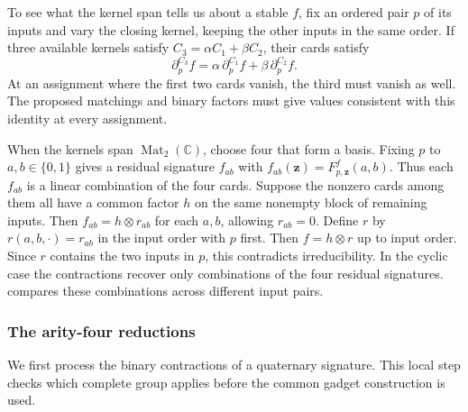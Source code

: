 \documentclass[11pt,letterpaper,onecolumn]{article}
\theoremstyle{plain}
\theoremstyle{definition}
\theoremstyle{remark}
\newcommand{\Mat}{\operatorname{Mat}}
\begin{document}
To see what the kernel span tells us about a stable \(f\), fix an ordered
pair \(p\) of its inputs and vary the closing kernel, keeping the other
inputs in the same order. If three available kernels satisfy
\(C_3=\alpha C_1+\beta C_2\), their cards satisfy
\[
  \partial_p^{C_3}f=\alpha\,\partial_p^{C_1}f+\beta\,\partial_p^{C_2}f .
\]
At an assignment where the first two cards vanish, the third must vanish
as well. The proposed matchings and binary factors must give values
consistent with this identity at every assignment.

When the kernels span \(\Mat_2(\mathbb C)\), choose four that form a basis.
Fixing \(p\) to \(a,b\in\{0,1\}\) gives a residual signature \(f_{ab}\)
with \(f_{ab}({\mathbf z})=F^f_{p,{\mathbf z}}(a,b)\).
Thus each \(f_{ab}\) is a linear combination of the four cards. Suppose the nonzero cards among them all have
a common factor \(h\) on the same nonempty block of remaining inputs. Then
\(f_{ab}=h\otimes r_{ab}\) for each \(a,b\), allowing \(r_{ab}=0\).
Define \(r\) by \(r(a,b,\mathord\cdot)=r_{ab}\) in the input order
with \(p\) first. Then \(f=h\otimes r\) up to input order. Since \(r\)
contains the two inputs in \(p\), this contradicts irreducibility.
In the cyclic case the contractions recover only combinations of the four residual signatures.
 compares these combinations across different input pairs.

\subsubsection{The arity-four reductions}

We first process the binary contractions of a quaternary signature. This
local step checks which complete group applies before the common gadget
construction is used.
\end{document}
